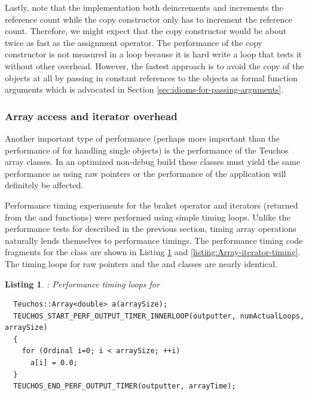 \documentclass[pdf,ps2pdf,11pt]{SANDreport}
\newtheorem{listing}{Listing}
\begin{document}
Lastly, note that the {} implementation both
deincrements and increments the reference count while the copy
constructor only has to increment the reference count.  Therefore, we
might expect that the copy constructor would be about twice as fast as
the assignment operator.  The performance of the copy constructor is
not measured in a loop because it is hard write a loop that tests it
without other overhead.  However, the fastest approach is to avoid the
copy of the {} objects at all by passing in constant
references to the {} objects as formal function arguments
which is advocated in Section
{}\ref{sec:idioms-for-passing-arguments}.


%
{}\subsubsection{Array access and iterator overhead}
\label{sec:array-overhead}
%

Another important type of performance (perhaps more important than the
performance of {} for handling single objects) is the
performance of the Teuchos array classes.  In an optimized non-debug
build these classes must yield the same performance as using raw
pointers or the performance of the application will definitely be
affected.

Performance timing experiments for the braket operator
{} and iterators (returned from the
{} and {} functions) were performed using
simple timing loops.  Unlike the performance tests for {}
described in the previous section, timing array operations naturally
lends themselves to performance timings.  The performance timing code
fragments for the {} class are shown in Listing
{}\ref{listing:Array-bracket-timing} and
{}\ref{listing:Array-iterator-timing}.  The timing loops for raw
pointers and the {} and {} classes are
nearly identical.


\begin{listing}: Performance timing loops for
{} \\
\label{listing:Array-bracket-timing}
{\small\begin{verbatim}
  Teuchos::Array<double> a(arraySize); 
  TEUCHOS_START_PERF_OUTPUT_TIMER_INNERLOOP(outputter, numActualLoops, arraySize) 
  { 
    for (Ordinal i=0; i < arraySize; ++i) 
      a[i] = 0.0; 
  }
  TEUCHOS_END_PERF_OUTPUT_TIMER(outputter, arrayTime); 
\end{verbatim}}
\end{listing}
\end{document}
